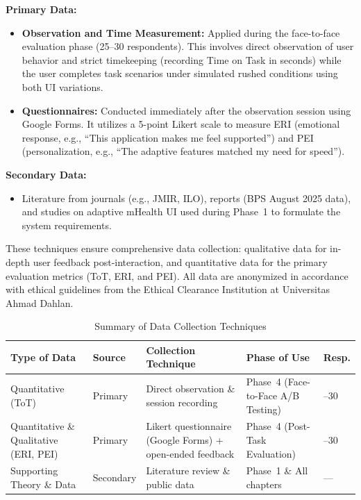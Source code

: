 \textbf{Primary Data:}
\begin{itemize}
    \item \textbf{Observation and Time Measurement:} Applied during the face-to-face evaluation phase (25--30 respondents). This involves direct observation of user behavior and strict timekeeping (recording Time on Task in seconds) while the user completes task scenarios under simulated rushed conditions using both UI variations.
    \item \textbf{Questionnaires:} Conducted immediately after the observation session using Google Forms. It utilizes a 5-point Likert scale to measure ERI (emotional response, e.g., ``This application makes me feel supported'') and PEI (personalization, e.g., ``The adaptive features matched my need for speed'').
\end{itemize}

\textbf{Secondary Data:}
\begin{itemize}
    \item Literature from journals (e.g., JMIR, ILO), reports (BPS August 2025 data), and studies on adaptive mHealth UI used during Phase~1 to formulate the system requirements.
\end{itemize}

These techniques ensure comprehensive data collection: qualitative data for in-depth user feedback post-interaction, and quantitative data for the primary evaluation metrics (ToT, ERI, and PEI). All data are anonymized in accordance with ethical guidelines from the Ethical Clearance Institution at Universitas Ahmad Dahlan.

\begin{table}[htbp]
    \centering
    \small
    \setlength{\tabcolsep}{4pt}
    \renewcommand{\arraystretch}{1.15}
    \caption{Summary of Data Collection Techniques}
    \label{tab:datacollection}
    \begin{tabular}{>{\raggedright\arraybackslash}p{} >{\raggedright\arraybackslash}p{} >{\raggedright\arraybackslash}p{} >{\raggedright\arraybackslash}p{} >{\centering\arraybackslash}p{}}
    \hline
    \textbf{Type of Data} & \textbf{Source} & \textbf{Collection Technique} & \textbf{Phase of Use} & \textbf{Resp.} \\
    \hline \hline
    Quantitative (ToT) & Primary & Direct observation \& session recording & Phase~4 (Face-to-Face A/B Testing) & 25--30 \\
    \hline
    Quantitative \& Qualitative (ERI, PEI) & Primary & Likert questionnaire (Google Forms) + open-ended feedback & Phase~4 (Post-Task Evaluation) & 25--30 \\
    \hline
    Supporting Theory \& Data & Secondary & Literature review \& public data & Phase~1 \& All chapters & --- \\
    \hline
    \end{tabular}
\end{table}

